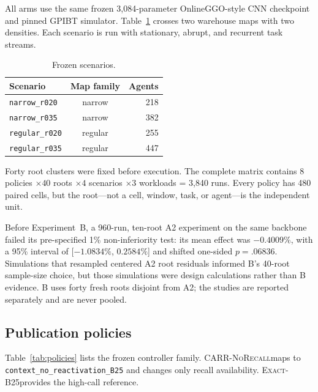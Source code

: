\documentclass[sigconf,anonymous,review]{acmart}
\newcommand{\norecall}{\textsc{CARR-NoRecall}}
\newcommand{\exactdense}{\textsc{Exact-B25}}
\begin{document}
All arms use the same frozen 3,084-parameter OnlineGGO-style CNN checkpoint
and pinned GPIBT simulator. Table~\ref{tab:scenarios} crosses two warehouse
maps with two densities. Each scenario is run with stationary, abrupt, and
recurrent task streams.

\begin{table}[t]
\caption{Frozen scenarios.}
\label{tab:scenarios}
\centering
\small
\begin{tabular}{lcr}
\toprule
Scenario & Map family & Agents \\
\midrule
\texttt{narrow\_r020}  & narrow  & 218 \\
\texttt{narrow\_r035}  & narrow  & 382 \\
\texttt{regular\_r020} & regular & 255 \\
\texttt{regular\_r035} & regular & 447 \\
\bottomrule
\end{tabular}
\end{table}

Forty root clusters were fixed before execution. The complete matrix contains
$8$ policies $\times40$ roots $\times4$ scenarios $\times3$ workloads = 3{,}840
runs. Every policy has 480 paired cells, but the root---not a cell, window,
task, or agent---is the independent unit.

Before Experiment~B, a 960-run, ten-root A2 experiment on the same backbone
failed its pre-specified 1\% non-inferiority test: its mean effect was
$-0.4009\%$, with a 95\% interval of [$-1.0834\%$, $0.2584\%$] and shifted
one-sided $p=.06836$. Simulations that resampled centered A2 root residuals
informed B's 40-root sample-size choice, but those simulations were design
calculations rather than B evidence. B uses forty fresh roots disjoint from A2;
the studies are reported separately and are never pooled.

\subsection{Publication policies}

Table~\ref{tab:policies} lists the frozen controller family. \norecall maps to
\texttt{context\_no\_reactivation\_B25} and changes only recall availability.
\exactdense provides the high-call reference.
\end{document}
